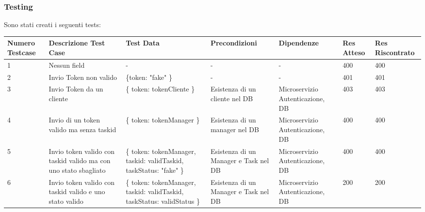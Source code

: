 \documentclass{report}
\begin{document}
\subsubsection*{Testing}

Sono stati creati i seguenti tests:

\begin{center} %
	\centering
	\begin{tabular}{ |p{1cm}|p{2cm}|p{2cm}|p{2cm}|p{2cm}|p{1cm}|p{1cm}| }
		\hline
		Numero Testcase & Descrizione Test Case                                           & Test Data                                                               & Precondizioni                         & Dipendenze                       & Res Atteso & Res Riscontrato \\
		\hline
		1               & Nessun field                                                    & -                                                                       & -                                     & -                                & 400        & 400             \\
		\hline
		2               & Invio Token non valido                                          & \{token: "fake" \}                                                      & -                                     & -                                & 401        & 401             \\
		\hline
		3               & Invio Token da un cliente                                       & \{ token: tokenCliente \}                                               & Esistenza di un cliente nel DB        & Microservizio Autenticazione, DB & 403        & 403             \\
		\hline
		4               & Invio di un token valido ma senza taskid                        & \{ token: tokenManager \}                                               & Esistenza di un manager nel DB        & Microservizio Autenticazione, DB & 400        & 400             \\
		\hline
		5               & Invio token valido con taskid valido ma con uno stato sbagliato & \{ token: tokenManager, taskid: validTaskid, taskStatus: "fake" \}      & Esistenza di un Manager e Task nel DB & Microservizio Autenticazione, DB & 400        & 400             \\
		\hline
		6               & Invio token valido con taskid valido e uno stato valido         & \{ token: tokenManager, taskid: validTaskid, taskStatus: validStatus \} & Esistenza di un Manager e Task nel DB & Microservizio Autenticazione, DB & 200        & 200             \\
		\hline
	\end{tabular}
\end{center}
\end{document}
